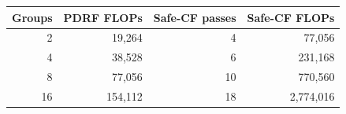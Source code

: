 \begin{tabular}{rrrr}
\toprule
Groups & PDRF FLOPs & Safe-CF passes & Safe-CF FLOPs \\
\midrule
2 & 19,264 & 4 & 77,056 \\
4 & 38,528 & 6 & 231,168 \\
8 & 77,056 & 10 & 770,560 \\
16 & 154,112 & 18 & 2,774,016 \\
\bottomrule
\end{tabular}
